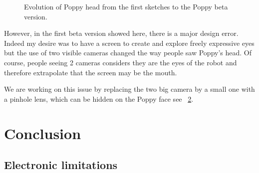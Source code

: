 \begin{figure}[p]
\centering
    \hfil
    \newline
    \hfil
    \newline
    \hfil
    \caption{Evolution of Poppy head from the first sketches to the Poppy beta version.}
    \label{fig:head_sketch}
\end{figure}


However, in the first beta version showed here, there is a major design error. Indeed my desire was to have a screen to create and explore freely expressive eyes but the use of two visible cameras changed the way people saw Poppy's head. Of course, people seeing 2 cameras considers they are the eyes of the robot and therefore extrapolate that the screen may be the mouth.

We are working on this issue by replacing the two big camera by a small one with a pinhole lens, which can be hidden on the Poppy face see \figurename~\ref{fig:poppy_head_v1}.

\begin{figure}[tb]
\centering
    \caption{}
    \label{fig:poppy_head_v1}
\end{figure}




\section{Conclusion} %


\subsection{Electronic limitations} %

